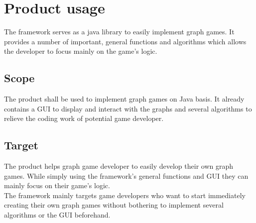 \section{Product usage}
The \gls{framework} serves as a \Gls{java} \gls{library} to easily implement \gls{graph} games. It provides a number of important, general functions and algorithms which allows the \gls{developer} to focus mainly on the game's logic.

\subsection{Scope}
The product shall be used to implement graph games on Java basis. It already contains a \gls{GUI} to display and interact with the graphs and several algorithms to relieve the coding work of potential game developer.

\subsection{Target}
The product helps graph game developer to easily develop their own graph games. While simply using the framework's general functions and \gls{GUI} they can mainly focus on their game's logic. \\
The framework mainly targets game developers who want to start immediately creating their own graph games without bothering to implement several algorithms or the \gls{GUI} beforehand.